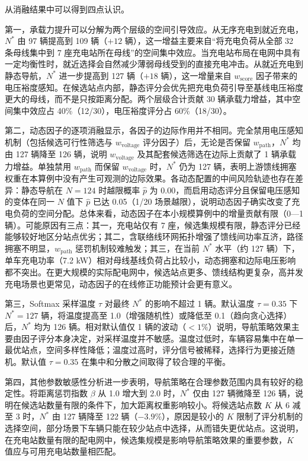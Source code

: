 \documentclass[10pt,a4paper]{article}
\numberwithin{equation}{section}
\numberwithin{table}{section}
\numberwithin{figure}{section}
\begin{document}
    从消融结果中可以得到四点认识。

    第一，承载力提升可以分解为两个层级的空间引导效应。从无序充电到就近充电，$N^*$ 由 97 辆提高到 109 辆（$+12$ 辆），这一增益主要来自“将充电负荷从全部 32 条母线集中到 7 座充电站所在母线”的空间集中效应。当充电站布局在电网中具有一定均衡性时，就近选择会自然减少薄弱母线受到的直接充电冲击。从就近充电到静态导航，$N^*$ 进一步提高到 127 辆（$+18$ 辆），这一增量来自 $w_{\text{score}}$ 因子带来的电压裕度感知。在候选站点内部，静态评分会优先把充电负荷引导至基线电压裕度更大的母线，而不是只按距离分配。两个层级合计贡献 30 辆承载力增益，其中空间集中效应占 40\%（12/30），电压裕度评分占 60\%（18/30）。

    第二，动态因子的逐项消融显示，各因子的边际作用并不相同。完全禁用电压感知机制（包括候选可行性筛选与 $w_{\text{voltage}}$ 评分因子）后，无论是否保留 $w_{\text{path}}$，$N^*$ 均由 127 辆降至 126 辆，说明 $w_{\text{voltage}}$ 及其配套候选筛选在边际上贡献了 1 辆承载力增益。单独禁用 $w_{\text{path}}$ 而保留 $w_{\text{voltage}}$ 时，$N^*$ 仍为 127 辆，表明上游馈线拥塞权重在本算例中没有产生可观测的边际效果。各动态配置的中间风险轨迹也存在差异：静态导航在 $N = 124$ 时越限概率 $\hat{p}$ 为 0.00，而启用动态评分且保留电压感知的变体在同一 $N$ 值下 $\hat{p}$ 已达 0.05（1/20 场景越限），说明动态因子确实改变了充电负荷的空间分配。总体来看，动态因子在本小规模算例中的增量贡献有限（0—1 辆）。可能原因有三点：其一，充电站仅有 7 座，候选集规模有限，静态评分已经能够较好地区分站点优劣；其二，含联络线环网拓扑增强了馈线间功率互济，路径拥塞不明显，$w_{\text{path}}$ 惩罚机制较难触发；其三，在当前 $N^*$ 水平（约 127 辆）下，单车充电功率（7.2 kW）相对母线基线负荷占比较小，动态拥塞和边际电压影响都不突出。在更大规模的实际配电网中，候选站点更多、馈线结构更复杂，高并发充电场景也更常见，动态因子的在线修正功能预计会更有意义。

    第三，Softmax 采样温度 $\tau$ 对最终 $N^*$ 的影响不超过 1 辆。默认温度 $\tau = 0.35$ 下 $N^* = 127$ 辆，将温度提高至 1.0（增强随机性）或降低至 0.1（趋向贪心选择）后，$N^*$ 均为 126 辆。相对默认值仅 1 辆的波动（$< 1\%$）说明，导航策略效果主要由因子评分本身决定，对采样温度并不敏感。温度过低时，车辆容易集中在单一最优站点，空间多样性降低；温度过高时，评分信号被稀释，选择行为更接近随机。默认值 $\tau = 0.35$ 在集中和分散之间取得了较合理的平衡。

    第四，其他参数敏感性分析进一步表明，导航策略在合理参数范围内具有较好的稳定性。将距离惩罚指数 $\beta$ 从 1.0 增大到 2.0 时，$N^*$ 仅由 127 辆微降至 126 辆，说明在候选站数量有限的条件下，加大距离权重影响较小。将候选站点数 $K$ 从 6 减至 3 时，$N^*$ 由 127 辆降至 122 辆（$-3.9\%$），原因是较小的 $K$ 限制了评分机制的选择空间，部分场景下车辆只能在较少站点中选择，从而错失更优站点。这说明，在充电站数量有限的配电网中，候选集规模是影响导航策略效果的重要参数，$K$ 值应与可用充电站数量相匹配。
\end{document}
